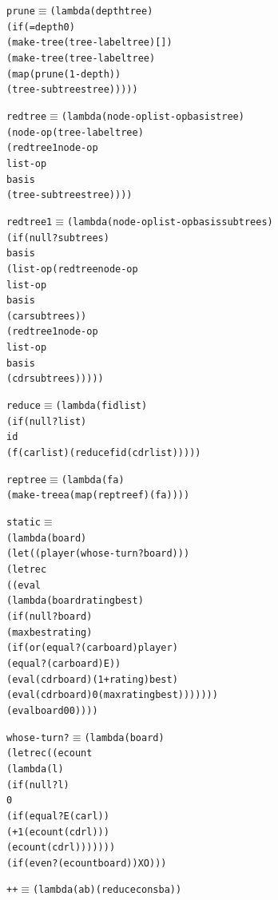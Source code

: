 \begin{alltt}
prune \(\equiv\) (lambda (depth tree)
          (if (= depth 0)
              (make-tree (tree-label tree) [])
              (make-tree (tree-label tree)
                         (map (prune (1- depth))
                              (tree-subtrees tree)))))

redtree \(\equiv\) (lambda (node-op list-op basis tree)
            (node-op (tree-label tree)
                     (redtree1 node-op
                               list-op
                               basis
                               (tree-subtrees tree))))

redtree1 \(\equiv\) (lambda (node-op list-op basis subtrees)
             (if (null? subtrees)
                 basis
                 (list-op (redtree node-op
                                   list-op
                                   basis
                                   (car subtrees))
                          (redtree1 node-op
                                    list-op
                                    basis
                                    (cdr subtrees)))))

reduce \(\equiv\) (lambda (f id list)
           (if (null? list)
               id
               (f (car list) (reduce f id (cdr list)))))

reptree \(\equiv\) (lambda (f a)
            (make-tree a (map (reptree f) (f a))))

static \(\equiv\)
  (lambda (board)
    (let ((player (whose-turn? board)))
      (letrec
        ((eval
          (lambda (board rating best)
            (if (null? board)
                (max best rating)
                (if (or (equal? (car board) player)
                        (equal? (car board) E))
                    (eval (cdr board) (1+ rating) best)
                    (eval (cdr board) 0 (max rating best)))))))
        (eval board 0 0))))

whose-turn? \(\equiv\) (lambda (board)
                (letrec ((ecount
                          (lambda (l)
                            (if (null? l)
                                0
                                (if (equal? E (car l))
                                    (+ 1 (ecount (cdr l)))
                                    (ecount (cdr l)))))))
                  (if (even? (ecount board)) X O)))

\texttt{++} \(\equiv\) (lambda (a b) (reduce cons b a))
\end{alltt}

